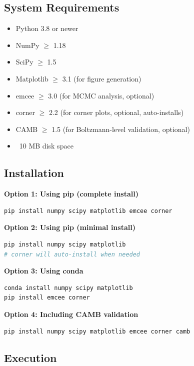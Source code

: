 \documentclass[11pt]{article}
\begin{document}
\subsection{System Requirements}

\begin{itemize}
    \item Python 3.8 or newer
    \item NumPy $\geq$ 1.18
    \item SciPy $\geq$ 1.5
    \item Matplotlib $\geq$ 3.1 (for figure generation)
    \item emcee $\geq$ 3.0 (for MCMC analysis, optional)
    \item corner $\geq$ 2.2 (for corner plots, optional, auto-installs)
    \item CAMB $\geq$ 1.5 (for Boltzmann-level validation, optional)
    \item ~10 MB disk space
\end{itemize}

\subsection{Installation}

\textbf{Option 1: Using pip (complete install)}
\begin{lstlisting}[language=bash]
pip install numpy scipy matplotlib emcee corner
\end{lstlisting}

\textbf{Option 2: Using pip (minimal install)}
\begin{lstlisting}[language=bash]
pip install numpy scipy matplotlib
# corner will auto-install when needed
\end{lstlisting}

\textbf{Option 3: Using conda}
\begin{lstlisting}[language=bash]
conda install numpy scipy matplotlib
pip install emcee corner
\end{lstlisting}

\textbf{Option 4: Including CAMB validation}
\begin{lstlisting}[language=bash]
pip install numpy scipy matplotlib emcee corner camb
\end{lstlisting}

\subsection{Execution}
\end{document}
